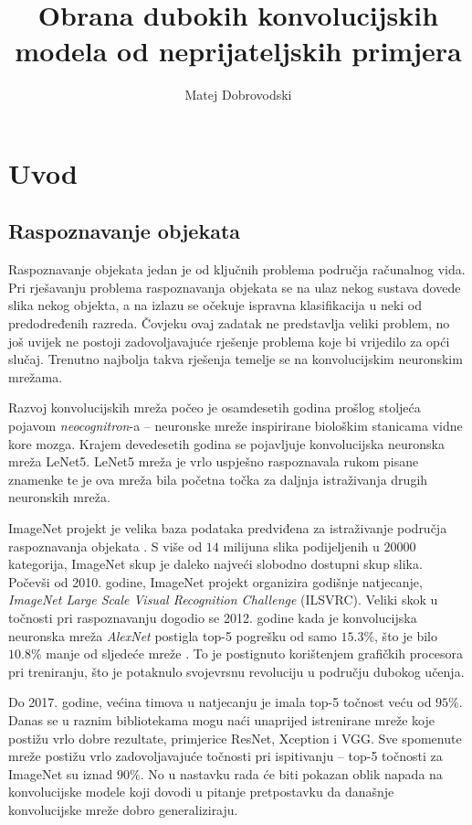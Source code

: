 \documentclass[utf8, diplomski]{fer}
\begin{document}
\title{Obrana dubokih konvolucijskih modela od neprijateljskih primjera}
\author{Matej Dobrovodski}

\maketitle

\zahvala{}
\tableofcontents

\chapter{Uvod}
\section{Raspoznavanje objekata}
Raspoznavanje objekata jedan je od ključnih problema područja računalnog vida. Pri rješavanju problema raspoznavanja objekata se na ulaz nekog sustava dovede slika nekog objekta, a na izlazu se očekuje ispravna klasifikacija u neki od predodređenih razreda. Čovjeku ovaj zadatak ne predstavlja veliki problem, no još uvijek ne postoji zadovoljavajuće rješenje problema koje bi vrijedilo za opći slučaj. Trenutno najbolja takva rješenja temelje se na konvolucijskim neuronskim mrežama. \par
Razvoj konvolucijskih mreža počeo je osamdesetih godina prošlog stoljeća pojavom \textit{neocognitron}-a -- neuronske mreže inspirirane biološkim stanicama vidne kore mozga. Krajem devedesetih godina se pojavljuje konvolucijska neuronska mreža LeNet5. LeNet5 mreža je vrlo uspješno raspoznavala rukom pisane znamenke te je ova mreža bila početna točka za daljnja istraživanja drugih neuronskih mreža. \par
ImageNet projekt je velika baza podataka predviđena za istraživanje područja raspoznavanja objekata \citep{ILSVRC15}. S više od $14$ milijuna slika podijeljenih u $20000$ kategorija, ImageNet skup je daleko najveći slobodno dostupni skup slika. Počevši od 2010. godine, ImageNet projekt organizira godišnje natjecanje, \textit{ImageNet Large Scale Visual Recognition Challenge} (ILSVRC). Veliki skok u točnosti pri raspoznavanju dogodio se 2012. godine kada je konvolucijska neuronska mreža \textit{AlexNet} postigla top-5 pogrešku od samo $15.3\%$, što je bilo $10.8\%$ manje od sljedeće mreže \citep{alexnet}. To je postignuto korištenjem grafičkih procesora pri treniranju, što je potaknulo svojevrsnu revoluciju u području dubokog učenja. \par
Do 2017. godine, većina timova u natjecanju je imala top-5 točnost veću od $95\%$. Danas se u raznim bibliotekama mogu naći unaprijed istrenirane mreže koje postižu vrlo dobre rezultate, primjerice ResNet, Xception i VGG. Sve spomenute mreže postižu vrlo zadovoljavajuće točnosti pri ispitivanju -- top-5 točnosti za ImageNet su iznad $90\%$. No u nastavku rada će biti pokazan oblik napada na konvolucijske modele koji dovodi u pitanje pretpostavku da današnje konvolucijske mreže dobro generaliziraju.
\end{document}

